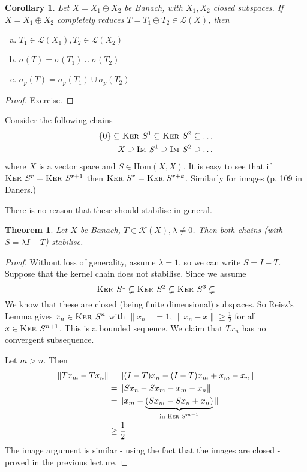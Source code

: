 \documentclass[10pt, oneside, reqno]{amsart}
\theoremstyle{plain}%
\newtheorem{thm}{Theorem}[section]
\newtheorem*{cor}{Corollary}
\theoremstyle{definition}
\theoremstyle{remark}
\newcommand{\im}{\textsc{Im\ }}
\renewcommand{\ker}{\textsc{Ker\ }}
\begin{document}
\begin{cor}
    Let $X = X_1 \oplus X_2$ be Banach, with $X_1, X_2$ closed subspaces.  If $X = X_1 \oplus X_2$ completely reduces $T = T_1 \oplus T_2 \in \mathcal L(X)$, then \begin{enumerate}[(a)]
        \item $T_1 \in \mathcal L(X_1), T_2 \in \mathcal L(X_2)$
        \item $\sigma(T) = \sigma(T_1) \cup \sigma(T_2)$ 
        \item $\sigma_p(T) = \sigma_p(T_1) \cup \sigma_p(T_2)$
    \end{enumerate}  
\end{cor}

\begin{proof}
    Exercise.
\end{proof}

Consider the following chains \begin{align*}
    \{ 0 \} \subseteq \ker S^1 \subseteq \ker S^2 \subseteq \dots \\
    X \supseteq \im S^1 \supseteq \im S^2 \supseteq \dots
\end{align*} where $X$ is a vector space and $S \in \text{Hom}(X, X)$.  It is easy to see that if $\ker S^r = \ker S^{r+1}$ then $\ker S^r = \ker S^{r+k}$.  Similarly for images (p. 109 in Daners.)

There is no reason that these should stabilise in general.
\begin{thm}
    Let $X$ be Banach, $T \in \mathcal K(X), \lambda \neq 0$.  Then both chains (with $S = \lambda I - T$) stabilise.  
\end{thm}
\begin{proof}
     Without loss of generality, assume $\lambda = 1$, so we can write $S = I - T$.  Suppose that the kernel chain does not stabilise.  Since we assume \[
        \ker S^1 \subsetneq \ker S^2 \subsetneq \ker S^3 \subsetneq
     \]  We know that these are closed (being finite dimensional) subspaces.  So Reisz's Lemma gives $x_n \in \ker S^n$ with $\| x_n \| = 1$, $\|x_n - x \| \geq \frac{1}{2}$ for all $x \in \ker S^{n+1}$. This is a bounded sequence.  We claim that $T x_n$ has no convergent subsequence.  
    
    Let $m > n$.  Then \begin{align*}
        \| Tx_m - Tx_n \|   &= \| ( I - T) x_n - (I-T) x_m + x_m - x_n \| \\
                            &= \| Sx_n - Sx_m - x_m - x_n \|\\
                            &= \| x_m - \underbrace{(S x_m  - S x_n  + x_n)}_\text{in $\ker S^{m-1}$} \| \\
                            &\geq \frac{1}{2}
    \end{align*}  The image argument is similar - using the fact that the images are closed - proved in the previous lecture.
\end{proof}
\end{document}
